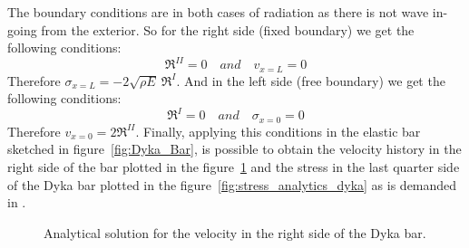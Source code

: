 \documentclass[preprint,12pt,a4paper]{elsarticle}
\begin{document}
The boundary conditions are in both cases of radiation as there is not
wave in-going from the exterior. So for the right side (fixed
boundary) we get the following conditions:
\begin{equation*}
  \Re^{II} = 0 \quad and \quad v_{x=L} = 0
\end{equation*}
Therefore $\sigma_{x=L} = -2\sqrt{\rho E}\ \Re^{I}$. And in the left side
(free boundary) we get the following conditions:
\begin{equation*}
  \Re^{I} = 0 \quad and \quad \sigma_{x=0} = 0
\end{equation*}
Therefore $v_{x=0} = 2\Re^{II}$. Finally, applying this conditions in
the elastic bar sketched in figure~\ref{fig:Dyka_Bar}, is possible to obtain
the velocity history in the right side of the bar plotted in the figure~\ref{fig:vel_analytics_dyka} and the stress in the last quarter side of the Dyka
bar plotted in the figure~\ref{fig:stress_analytics_dyka} as is demanded in \cite{Dyka1995}.

\begin{figure}\sidecaption
  \centering
  \caption[Velocities values in the right side of the Dyka
  bar]{Analytical solution for the velocity in the right side of the Dyka bar.}
  \label{fig:vel_analytics_dyka}
\end{figure}
\end{document}
